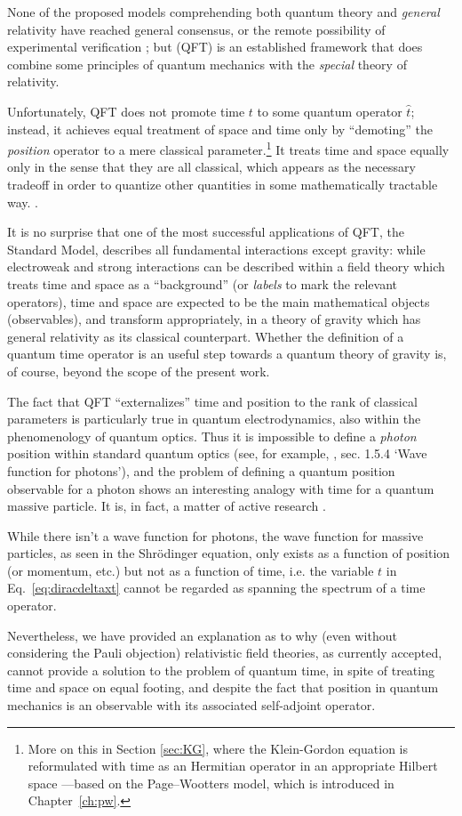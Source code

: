 None of the proposed models comprehending both quantum theory and \emph{general} relativity
have reached general consensus,
or the remote possibility of experimental verification \parencite{QGravIntro};
but  (QFT) is an established framework that does combine
some principles
of quantum mechanics with the \emph{special} theory of relativity.

Unfortunately, QFT does not promote time $t$ to some quantum operator $\hat{t}$;
instead, it achieves equal treatment of space and time only by
``demoting'' the \emph{position} operator to a mere classical parameter.\footnote{
  More on this in Section \ref{sec:KG}, where the Klein-Gordon equation is reformulated
  with time as an Hermitian operator in an appropriate Hilbert space
  ---based on the Page--Wootters model, which is introduced in Chapter~\ref{ch:pw}.
}
It treats time and space equally only in the sense that they are all classical,
which appears as the necessary tradeoff in order to quantize other quantities
in some mathematically tractable way. \parencite[sec.I.1]{SrednickiQFT}.

It is no surprise that one of the most successful applications
of QFT, the Standard Model, describes all fundamental interactions except gravity:
while electroweak and strong interactions can be described within a field theory
which treats time and space as a ``background'' (or \emph{labels} to mark the relevant operators),
time and space are expected to be the main mathematical objects (observables),
and transform appropriately,
in a theory of gravity
which has general relativity as its classical counterpart.
Whether the definition of a quantum time operator is an useful step towards
a quantum theory of gravity is, of course, beyond the scope of the present work.

The fact that QFT ``externalizes'' time and position to the rank of classical parameters
is particularly true in quantum electrodynamics, also within the
phenomenology of quantum optics.
Thus it is impossible to define a \emph{photon} position
within standard quantum optics (see, for example, \cite{ScullyZubairy}, sec. 1.5.4 `Wave function for photons'),
and the problem of defining a quantum position observable for a photon
shows an interesting analogy with time for a quantum massive particle.
It is, in fact, a matter of active research \parencite{HawtonPhotonPosition, Hawton2019}.

While there isn't a wave function for photons, the wave function for massive particles,
as seen in the Shr\"{o}dinger equation, only exists as a function of position (or momentum, etc.)
but not as a function of time,
i.e. the variable $t$ in Eq.~\eqref{eq:diracdeltaxt}
cannot be regarded as spanning the spectrum of a time operator.

Nevertheless, we have provided an explanation as to why (even without considering the Pauli objection)
relativistic field theories, as currently accepted, cannot provide a solution
to the problem of quantum time, in spite of treating time and space on equal footing,
and despite the fact that position in quantum mechanics is an observable
with its associated self-adjoint operator.
